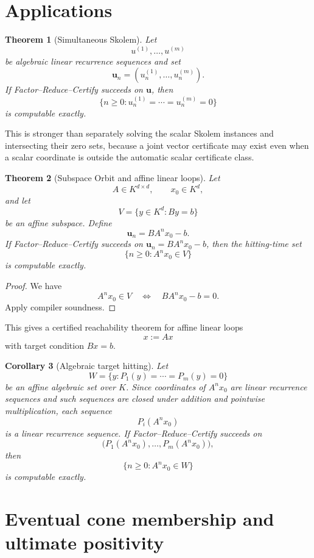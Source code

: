 \documentclass[11pt]{article}
\newtheorem{theorem}{Theorem}[section]
\newtheorem{corollary}[theorem]{Corollary}
\begin{document}
\section{Applications}

\begin{theorem}[Simultaneous Skolem]
Let
\[
u^{(1)},\ldots,u^{(m)}
\]
be algebraic linear recurrence sequences and set
\[
\mathbf u_n=(u^{(1)}_n,\ldots,u^{(m)}_n).
\]
If Factor--Reduce--Certify succeeds on \(\mathbf u\), then
\[
\{n\ge0:u^{(1)}_n=\cdots=u^{(m)}_n=0\}
\]
is computable exactly.
\end{theorem}

This is stronger than separately solving the scalar Skolem instances and intersecting their zero sets, because a joint vector certificate may exist even when a scalar coordinate is outside the automatic scalar certificate class.

\begin{theorem}[Subspace Orbit and affine linear loops]
Let
\[
A\in K^{d\times d},
\qquad
x_0\in K^d,
\]
and let
\[
V=\{y\in K^d:By=b\}
\]
be an affine subspace. Define
\[
\mathbf u_n=BA^nx_0-b.
\]
If Factor--Reduce--Certify succeeds on \(\mathbf u_n=BA^nx_0-b\), then the hitting-time set
\[
\{n\ge0:A^nx_0\in V\}
\]
is computable exactly.
\end{theorem}

\begin{proof}
We have
\[
A^nx_0\in V
\quad\Longleftrightarrow\quad
BA^nx_0-b=0.
\]
Apply compiler soundness.
\end{proof}

This gives a certified reachability theorem for affine linear loops
\[
x:=Ax
\]
with target condition \(Bx=b\).

\begin{corollary}[Algebraic target hitting]
Let
\[
W=\{y:P_1(y)=\cdots=P_m(y)=0\}
\]
be an affine algebraic set over \(K\). Since coordinates of \(A^nx_0\) are linear recurrence sequences and such sequences are closed under addition and pointwise multiplication, each sequence
\[
P_i(A^nx_0)
\]
is a linear recurrence sequence. If Factor--Reduce--Certify succeeds on
\[
\bigl(P_1(A^nx_0),\ldots,P_m(A^nx_0)\bigr),
\]
then
\[
\{n\ge0:A^nx_0\in W\}
\]
is computable exactly.
\end{corollary}

\section{Eventual cone membership and ultimate positivity}
\end{document}
